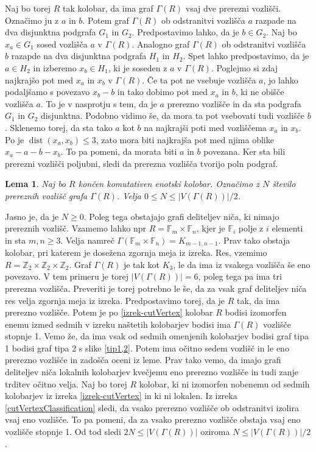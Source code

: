 \documentclass[a4paper, 12pt]{amsart}
\theoremstyle{definition} %
\theoremstyle{plain} %
\newtheorem{lema}[definicija]{Lema}
\newcommand{\Z}{\mathbb Z}
\newcommand{\F}{\mathbb F}
\DeclareMathOperator{\dist}{dist}
\begin{document}
Naj bo torej $R$ tak kolobar, da ima graf $\Gamma(R)$ vsaj dve prerezni vozlišči. Označimo ju z $a$ in $b$. Potem graf $\Gamma(R)$ ob odstranitvi vozlišča $a$ razpade na dva disjunktna podgrafa $G_1$ in $G_2$. Predpostavimo lahko, da je $b\in G_2$. Naj bo $x_a\in G_1$ sosed vozlišča $a$ v $\Gamma(R)$. Analogno graf $\Gamma(R)$ ob odstranitvi vozlišča $b$ razapde na dva disjunktna podgrafa $H_1$ in $H_2$. Spet lahko predpostavimo, da je $a\in H_2$ in izberemo $x_b\in H_1$, ki je soseden z $a$ v $\Gamma(R)$. Poglejmo si zdaj najkrajšo pot med $x_a$ in $x_b$ v $\Gamma(R)$. Če ta pot ne vsebuje vozlišča $a$, jo lahko podaljšamo s povezavo $x_b-b$ in tako dobimo pot med $x_a$ in $b$, ki ne obišče vozlišča $a$. To je v nasprotju s tem, da je $a$ prerezno vozlišče in da sta podgrafa $G_1$ in $G_2$ disjunktna. Podobno vidimo  še, da mora ta pot vsebovati tudi vozlišče $b$. Sklenemo torej, da sta tako $a$ kot $b$ na najkrajši poti med vozliščema $x_a$ in $x_b$. Po \cite{diploma} je $\dist(x_a,x_b)\le 3$, zato mora biti najkrajša pot med njima oblike $x_a  -  a - b - x_b$. To pa pomeni, da morata biti $a$ in $b$ povezana. Ker sta bili prerezni vozlišči poljubni, sledi da prerezna vozlišča tvorijo poln podgraf.
\endproof

\begin{lema}
Naj bo $R$ končen komutativen enotski kolobar. Označimo z $N$ število prereznih vozlišč grafa $\Gamma(R)$. Velja $0\le N \le |V(\Gamma(R))|/2$.
\end{lema}

\proof
Jasno je, da je $N\ge 0$. Poleg tega obstajajo grafi deliteljev niča, ki nimajo prereznih vozlišč. Vzamemo lahko npr $R=\F_m \times \F_n$, kjer je $\F_i$ polje z $i$ elementi in sta $m,n \ge 3$. Velja namreč $\Gamma(\F_m \times \F_n) = K_{m-1,n-1}$. Prav tako obstaja kolobar, pri katerem je dosežena zgornja meja iz izreka. Res, vzemimo $R=\Z_2 \times \Z_2 \times \Z_2$. Graf $\Gamma(R)$ je tak kot $K_3$, le da ima iz vsakega vozlišča še eno povezavo. V tem primeru je torej $|V(\Gamma(R))| = 6$, poleg tega pa ima tri prerezna vozlišča. Preveriti je torej potrebno le še, da za vsak graf deliteljev niča res velja zgornja meja iz izreka. Predpostavimo torej, da je $R$ tak, da ima prerezno vozlišče. Potem je po \ref{izrek-cutVertex} kolobar $R$ bodisi izomorfen enemu izmed sedmih v izreku naštetih kolobarjev bodisi ima $\Gamma(R)$ vozlišče stopnje 1. Vemo že, da ima vsak od sedmih omenjenih kolobarjev bodisi graf tipa 1 bodisi graf tipa 2 s slike \ref{tip1,2}. Potem ima očitno sedem vozlišč in le eno prerezno vozlišče in zadošča oceni iz leme. Prav tako vemo, da imajo grafi deliteljev niča lokalnih kolobarjev kvečjemu eno prerezno vozlišče in tudi zanje trditev očitno velja. Naj bo torej $R$ kolobar, ki ni izomorfen nobenemu od sedmih kolobarjev iz izreka \ref{izrek-cutVertex} in ki ni lokalen. Iz izreka \ref{cutVertexClassification} sledi, da vsako prerezno vozlišče ob odstranitvi izolira vsaj eno vozlišče. To pa pomeni, da za vsako prerezno vozlišče obstaja vsaj eno vozlišče stopnje 1. Od tod sledi $2N \le |V(\Gamma(R)) |$ oziroma $N \le |V(\Gamma(R))| /2$.
\endproof
\end{document}
